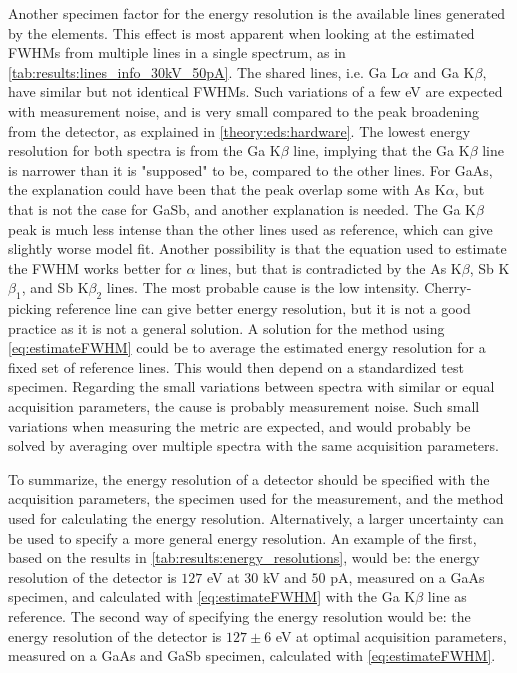 Another specimen factor for the energy resolution is the available lines generated by the elements.
This effect is most apparent when looking at the estimated FWHMs from multiple lines in a single spectrum, as in \cref{tab:results:lines_info_30kV_50pA}.
The shared lines, i.e. Ga L$\alpha$ and Ga K$\beta$, have similar but not identical FWHMs.
Such variations of a few eV are expected with measurement noise, and is very small compared to the peak broadening from the detector, as explained in \cref{theory:eds:hardware}.
The lowest energy resolution for both spectra is from the Ga K$\beta$ line, implying that the Ga K$\beta$ line is narrower than it is "supposed" to be, compared to the other lines.
For GaAs, the explanation could have been that the peak overlap some with As K$\alpha$, but that is not the case for GaSb, and another explanation is needed.
The Ga K$\beta$ peak is much less intense than the other lines used as reference, which can give slightly worse model fit.
Another possibility is that the equation used to estimate the FWHM works better for $\alpha$ lines, but that is contradicted by the As K$\beta$, Sb K$\beta_1$, and Sb K$\beta_2$ lines.
The most probable cause is the low intensity.
Cherry-picking reference line can give better energy resolution, but it is not a good practice as it is not a general solution.
A solution for the method using \cref{eq:estimateFWHM} could be to average the estimated energy resolution for a fixed set of reference lines.
This would then depend on a standardized test specimen.
Regarding the small variations between spectra with similar or equal acquisition parameters, the cause is probably measurement noise.
Such small variations when measuring the metric are expected, and would probably be solved by averaging over multiple spectra with the same acquisition parameters.


To summarize, the energy resolution of a detector should be specified with the acquisition parameters, the specimen used for the measurement, and the method used for calculating the energy resolution.
Alternatively, a larger uncertainty can be used to specify a more general energy resolution.
An example of the first, based on the results in \cref{tab:results:energy_resolutions}, would be:  the energy resolution of the detector is $127$ eV at $30$ kV and $50$ pA, measured on a GaAs specimen, and calculated with \cref{eq:estimateFWHM} with the Ga K$\beta$ line as reference.
The second way of specifying the energy resolution would be: the energy resolution of the detector is $127 \pm 6$ eV at optimal acquisition parameters, measured on a GaAs and GaSb specimen, calculated with \cref{eq:estimateFWHM}.



